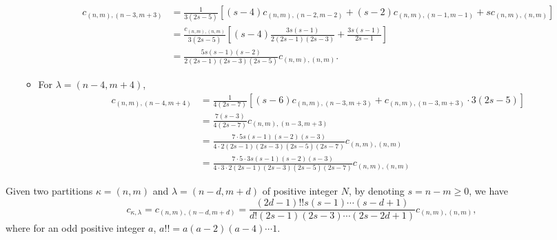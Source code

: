 \documentclass[10pt,oneside,american]{amsart}
\numberwithin{equation}{section}
\numberwithin{figure}{section}
\theoremstyle{definition}
\theoremstyle{remark}
\theoremstyle{plain}
\theoremstyle{definition}
\theoremstyle{plain}
\theoremstyle{plain}
\theoremstyle{plain}
\begin{document}
\begin{enumerate}
\begin{itemize}
\begin{align*}
c_{\left(n,m\right),\left(n-3,m+3\right)} & =\frac{1}{3\left(2s-5\right)}\left[\left(s-4\right)c_{\left(n,m\right),\left(n-2,m-2\right)}+\left(s-2\right)c_{\left(n,m\right),\left(n-1,m-1\right)}+sc_{\left(n,m\right),\left(n,m\right)}\right]\\
 & =\frac{c_{\left(n,m\right),\left(n,m\right)}}{3\left(2s-5\right)}\left[\left(s-4\right)\frac{3s\left(s-1\right)}{2\left(2s-1\right)\left(2s-3\right)}+\frac{3s\left(s-1\right)}{2s-1}\right]\\
 & =\frac{5s\left(s-1\right)\left(s-2\right)}{2\left(2s-1\right)\left(2s-3\right)\left(2s-5\right)}c_{\left(n,m\right),\left(n,m\right)}.
\end{align*}
\item For $\lambda=\left(n-4,m+4\right)$, 
\begin{align*}
c_{\left(n,m\right),\left(n-4,m+4\right)} & =\frac{1}{4\left(2s-7\right)}\left[\left(s-6\right)c_{\left(n,m\right),\left(n-3,m+3\right)}+c_{\left(n,m\right),\left(n-3,m+3\right)}\cdot3\left(2s-5\right)\right]\\
 & =\frac{7\left(s-3\right)}{4\left(2s-7\right)}c_{\left(n,m\right),\left(n-3,m+3\right)}\\
 & =\frac{7\cdot5s\left(s-1\right)\left(s-2\right)\left(s-3\right)}{4\cdot2\left(2s-1\right)\left(2s-3\right)\left(2s-5\right)\left(2s-7\right)}c_{\left(n,m\right),\left(n,m\right)}\\
 & =\frac{7\cdot5\cdot3s\left(s-1\right)\left(s-2\right)\left(s-3\right)}{4\cdot3\cdot2\left(2s-1\right)\left(2s-3\right)\left(2s-5\right)\left(2s-7\right)}c_{\left(n,m\right),\left(n,m\right)}
\end{align*}
\end{itemize}
\end{enumerate}
\begin{conjecture}
Given two partitions $\kappa=\left(n,m\right)$ and $\lambda=\left(n-d,m+d\right)$
of positive integer $N$, by denoting $s=n-m\geq0$, we have 
\begin{equation}
c_{\kappa,\lambda}=c_{\left(n,m\right),\left(n-d,m+d\right)}=\frac{\left(2d-1\right)!!s\left(s-1\right)\cdots\left(s-d+1\right)}{d!\left(2s-1\right)\left(2s-3\right)\cdots\left(2s-2d+1\right)}c_{\left(n,m\right),\left(n,m\right)},\label{eq:2PartRec}
\end{equation}
where for an odd positive integer $a$, $a!!=a\left(a-2\right)\left(a-4\right)\cdots1$. 
\end{conjecture}
\end{document}
